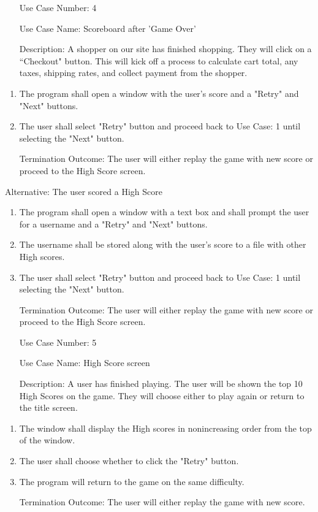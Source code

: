 \documentclass[10pt,conference,onecolumn,compsoc]{IEEEtran}
\begin{document}
\begin{itemize}
\item[Use Case Number:] 4
\item[Use Case Name:] Scoreboard after 'Game Over'
\item[Description:] A shopper on our site has finished shopping.  They will click on a ``Checkout" button.  This will kick off a process to calculate cart total, any taxes, shipping rates, and collect payment from the shopper.

\end{itemize}

\begin{enumerate}
\item The program shall open a window with the user's score and a "Retry" and "Next" buttons.
\item The user shall select "Retry" button and proceed back to Use Case: 1 until selecting the "Next" button.
\item[Termination Outcome:] The user will either replay the game with new score or proceed to the High Score screen.
\end{enumerate}

Alternative: The user scored a High Score
\begin{enumerate}
\item The program shall open a window with a text box and shall prompt the user for a username and a "Retry" and "Next" buttons.
\item The username shall be stored along with the user's score to a file with other High scores.
\item The user shall select "Retry" button and proceed back to Use Case: 1 until selecting the "Next" button.
\item[Termination Outcome:] The user will either replay the game with new score or proceed to the High Score screen.
\end{enumerate}

\begin{itemize}
\item[Use Case Number:] 5
\item[Use Case Name:] High Score screen
\item[Description:] A user has finished playing. The user will be shown the top 10 High Scores on the game. They will choose either to play again or return to the title screen.

\end{itemize}

\begin{enumerate}
\item The window shall display the High scores in nonincreasing order from the top of the window.
\item The user shall choose whether to click the "Retry" button.
\item The program will return to the game on the same difficulty.
\item[Termination Outcome:] The user will either replay the game with new score.
\end{enumerate}
\end{document}
